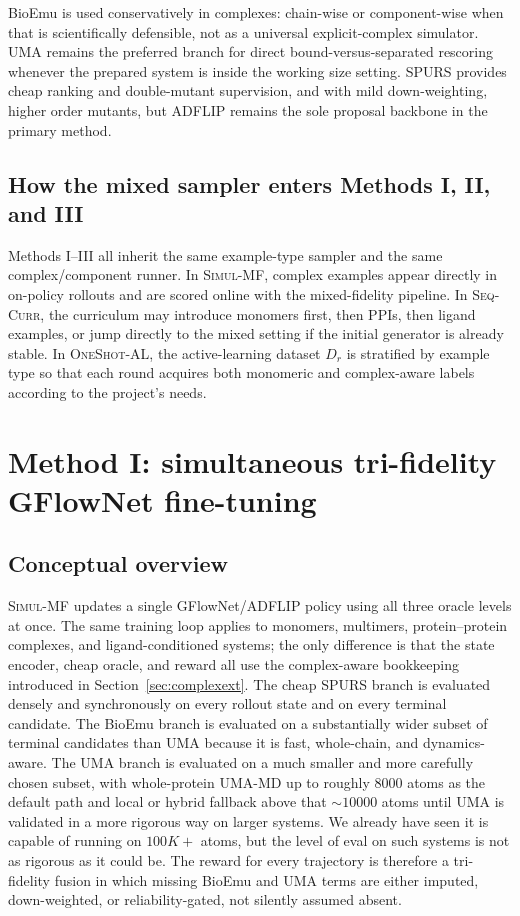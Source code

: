 \documentclass[11pt]{article}
\newcommand{\methodI}{\textsc{Simul-MF}}
\newcommand{\methodII}{\textsc{Seq-Curr}}
\newcommand{\methodIII}{\textsc{OneShot-AL}}
\begin{document}
BioEmu is used conservatively in complexes: chain-wise or component-wise when that is scientifically defensible, not as a universal explicit-complex simulator. UMA remains the preferred branch for direct bound-versus-separated rescoring whenever the prepared system is inside the working size setting. SPURS provides cheap ranking and double-mutant supervision, and with mild down-weighting, higher order mutants, but ADFLIP remains the sole proposal backbone in the primary method.


\subsection{How the mixed sampler enters Methods I, II, and III}

Methods I--III all inherit the same example-type sampler and the same complex/component runner. In \methodI{}, complex examples appear directly in on-policy rollouts and are scored online with the mixed-fidelity pipeline. In \methodII{}, the curriculum may introduce monomers first, then PPIs, then ligand examples, or jump directly to the mixed setting if the initial generator is already stable. In \methodIII{}, the active-learning dataset $D_r$ is stratified by example type so that each round acquires both monomeric and complex-aware labels according to the project's needs.

\section{Method I: simultaneous tri-fidelity GFlowNet fine-tuning}
\label{sec:method1}

\subsection{Conceptual overview}

\methodI{} updates a single GFlowNet/ADFLIP policy using all three oracle levels at once. The same training loop applies to monomers, multimers, protein--protein complexes, and ligand-conditioned systems; the only difference is that the state encoder, cheap oracle, and reward all use the complex-aware bookkeeping introduced in Section~\ref{sec:complexext}. The cheap SPURS branch is evaluated densely and synchronously on every rollout state and on every terminal candidate. The BioEmu branch is evaluated on a substantially wider subset of terminal candidates than UMA because it is fast, whole-chain, and dynamics-aware. The UMA branch is evaluated on a much smaller and more carefully chosen subset, with whole-protein UMA-MD up to roughly $8000$ atoms as the default path and local or hybrid fallback above that $\sim 10000$ atoms until UMA is validated in a more rigorous way on larger systems. We already have seen it is capable of running on $100K+$ atoms, but the level of eval on such systems is not as rigorous as it could be. The reward for every trajectory is therefore a tri-fidelity fusion in which missing BioEmu and UMA terms are either imputed, down-weighted, or reliability-gated, not silently assumed absent.
\end{document}
